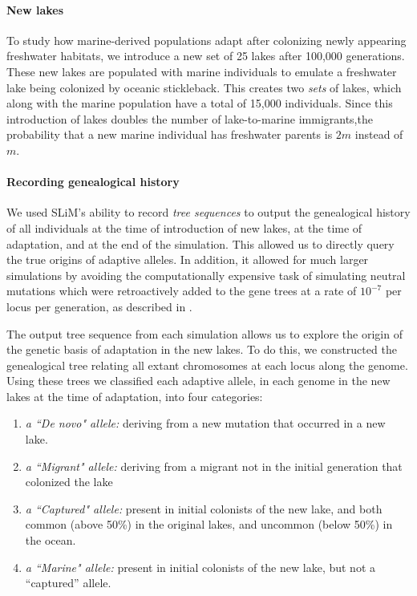 \documentclass{article}
\begin{document}
\paragraph{New lakes} 

To study how marine-derived populations adapt after colonizing newly appearing freshwater habitats, we introduce a new set of 25 lakes after 100,000 generations. These new lakes are populated with marine individuals to emulate a freshwater lake being colonized by oceanic stickleback. This creates two \emph{sets} of lakes, which along with the marine population have a total of 15,000 individuals. Since this introduction of lakes doubles the number of lake-to-marine immigrants,the probability that a new marine individual has freshwater parents is $2m$ instead of $m$.

\paragraph{Recording genealogical history}
We used SLiM's ability to record \emph{tree sequences} \citep{haller2018treesequence,Kelleher2016} to output the genealogical history of all individuals at the time of introduction of new lakes, at the time of adaptation, and at the end of the simulation. This allowed us to directly query the true origins of adaptive alleles. In addition, it allowed for much larger simulations by avoiding the computationally expensive task of simulating neutral mutations which were retroactively added to the gene trees at a rate of $10^{-7}$ per locus per generation, as described in \citet{kelleher2018efficient}.

The output tree sequence from each simulation allows us to explore the origin of the genetic basis of adaptation in the new lakes. To do this, we constructed the genealogical tree relating all extant chromosomes at each locus along the genome. Using these trees we classified each adaptive allele, in each genome in the new lakes at the time of adaptation, into four categories:

\begin{enumerate}
    \item \emph{a ``De novo" allele:}
        deriving from a new mutation that occurred in a new lake.
    \item \emph{a ``Migrant" allele:} 
        deriving from a migrant not in the initial generation that colonized the lake
    \item \emph{a ``Captured" allele:}
        present in initial colonists of the new lake, 
        and both common (above 50\%) in the original lakes,
        and uncommon (below 50\%) in the ocean.
    \item \emph{a ``Marine" allele:} 
        present in initial colonists of the new lake, 
        but not a ``captured'' allele.
\end{enumerate}
\end{document}
